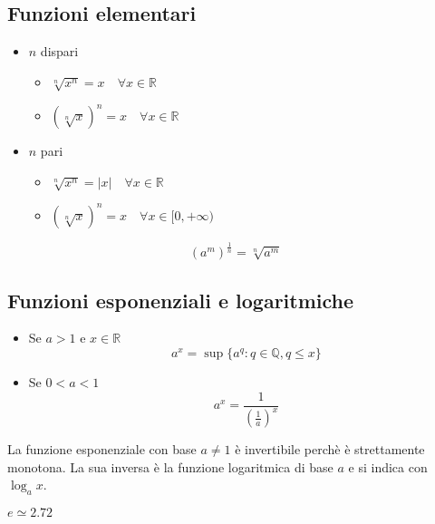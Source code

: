 \documentclass[12pt, a4paper]{report}
\begin{document}
    \subsection{Funzioni elementari}
    \begin{itemize}
        \item $n$ dispari \begin{itemize}
            \item $\sqrt[n]{x^{n}}=x \quad \forall x \in \mathbb{R}$
            \item $(\sqrt[n]{x})^{n}=x \quad \forall x \in \mathbb{R}$
        \end{itemize}
        \item $n$ pari \begin{itemize}
            \item $\sqrt[n]{x^{n}}=|x|  \quad \forall x \in \mathbb{R}$
            \item $(\sqrt[n]{x})^{n}=x \quad \forall x \in [0,+\infty)$ 
        \end{itemize}
    \end{itemize}
    \begin{equation*}
        (a^{m})^{\frac{1}{n}}=\sqrt[n]{a^{m}}
    \end{equation*}
    \subsection{Funzioni esponenziali e logaritmiche}
    \begin{itemize}
        \item Se $a>1$ e $x\in \mathbb{R}$ \begin{equation*}
            a^{x}=\sup\{a^{q}:q\in\mathbb{Q},q\leq x\}
        \end{equation*}
        \item Se $0<a<1$ \begin{equation*}
            a^{x}=\frac{1}{\left(\frac{1}{a}\right)^{x}}
        \end{equation*}
    \end{itemize}
    La funzione esponenziale con base $a\neq 1$ è invertibile perchè è strettamente monotona. La sua inversa è la funzione logaritmica di base $a$ e si indica con $\log_{a}x$.
    \begin{center}
    \end{center}
    $e \simeq 2.72$
\end{document}
